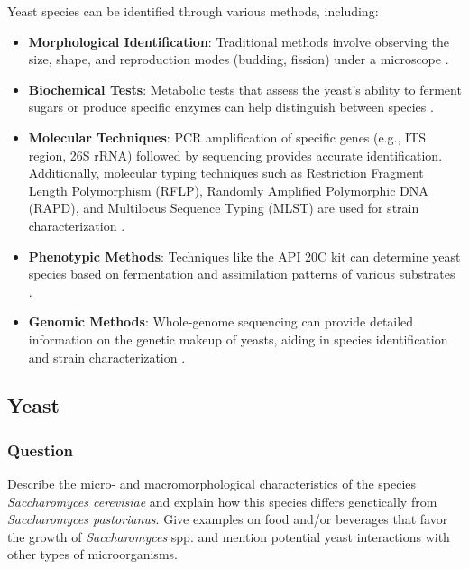 Yeast species can be identified through various methods, including:
\begin{itemize}
    \item \textbf{Morphological Identification}: Traditional methods involve observing the size, shape, and reproduction modes (budding, fission) under a microscope \cite*{L6-Yeasts,L9-Coryn}.
    \item \textbf{Biochemical Tests}: Metabolic tests that assess the yeast's ability to ferment sugars or produce specific enzymes can help distinguish between species \cite*{L6-Yeasts,L9-Coryn}.
    \item \textbf{Molecular Techniques}: PCR amplification of specific genes (e.g., ITS region, 26S rRNA) followed by sequencing provides accurate identification. Additionally, molecular typing techniques such as Restriction Fragment Length Polymorphism (RFLP), Randomly Amplified Polymorphic DNA (RAPD), and Multilocus Sequence Typing (MLST) are used for strain characterization \cite*{L9-ISAPP,L6-Yeasts}.
    \item \textbf{Phenotypic Methods}: Techniques like the API 20C kit can determine yeast species based on fermentation and assimilation patterns of various substrates \cite*{L6-Yeasts}.
    \item \textbf{Genomic Methods}: Whole-genome sequencing can provide detailed information on the genetic makeup of yeasts, aiding in species identification and strain characterization \cite*{L9-ISAPP}.
\end{itemize}

\subsection{Yeast}
\subsubsection*{Question}
Describe the micro- and macromorphological characteristics of the species \textit{Saccharomyces cerevisiae} and explain how this species differs genetically from \textit{Saccharomyces pastorianus}. Give examples on food and/or beverages that favor the growth of \textit{Saccharomyces} spp. and mention potential yeast interactions with other types of microorganisms. 

